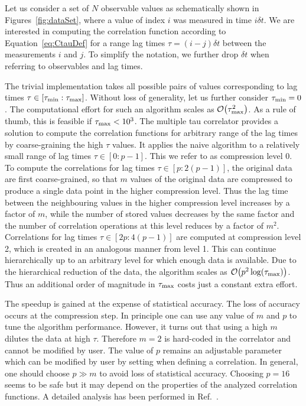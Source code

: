Let us consider a set of $N$ observable values as schematically shown
in Figures~\ref{fig:dataSet}, where a value of index $i$ was measured
in time $i\delta t$. We are interested in computing the correlation 
function according to Equation~\ref{eq:CtauDef} for a range lag times
$\tau = (i-j)\delta t$ between the measurements $i$ and $j$.
To simplify the notation, we further drop $\delta t$
when referring to observables and lag times. 

The trivial implementation takes all possible pairs of values
corresponding to lag times $\tau \in [\tau_{\mathrm{min}}:\tau_{\mathrm{max}}]$. 
Without loss of generality, let us further consider $\tau_{\mathrm{min}}=0$.
The computational effort for such an algorithm scales
as ${\cal O} \bigl(\tau_{\mathrm{max}}^2\bigr)$.
As a rule of thumb, this is feasible if $\tau_{\mathrm{max}} < 10^3$.
The multiple tau correlator provides a solution to compute the
correlation functions for arbitrary range of the lag times by
coarse-graining the high $\tau$ values. It applies the naive algorithm
to a relatively small range of lag times $\tau \in [0:p-1]$. This we refer
to as compression level 0. To compute the correlations for lag times
$\tau \in [p:2(p-1)]$, the original data are first coarse-grained, so
that $m$ values of the original data are compressed to produce a single
data point in the higher compression level. Thus the lag time between
the neighbouring values in the higher compression level increases
by a factor of $m$, while the number of stored values decreases by
the same factor and the number of correlation operations at this level
reduces by a factor of $m^2$. Correlations for lag times 
$\tau \in [2p:4(p-1)]$ are computed at compression level 2, which is created
in an analogous manner from level 1. This can continue hierarchically
up to an arbitrary level for which enough data is available. Due to the
hierarchical reduction of the data, the algorithm scales as 
${\cal O} \bigl( p^2 \log(\tau_{\mathrm{max}}) \bigr)$. Thus an additional order
of magnitude in $\tau_{\mathrm{max}}$ costs just a constant extra effort.

The speedup is gained at the expense of statistical accuracy.
The loss of accuracy occurs at the compression step.
In principle one can use any value of $m$ and $p$ to tune the algorithm
performance. However, it turns out that using a high $m$ dilutes the
data at high $\tau$. Therefore $m=2$ is hard-coded in the \es correlator
and cannot be modified by user. The value of $p$ remains an adjustable
parameter which can be modified by user by setting 
when defining a correlation. In general, one should choose $p \gg m$
to avoid loss of statistical accuracy. Choosing $p=16$ seems to be
safe but it may depend on the properties of the analyzed
correlation functions. A detailed analysis has been performed
in Ref.~\cite{ramirez10a}.

